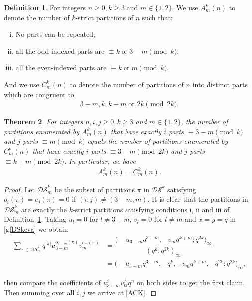 \documentclass[12pt]{amsart}
\numberwithin{equation}{section}
\theoremstyle{plain}
\newtheorem{theorem}{Theorem}[section]
\theoremstyle{definition}
\newtheorem{Def}[theorem]{Definition}
\begin{document}
\begin{Def}\label{kAC}
For integers $n\geq 0, k\geq 3$ and $m\in\{1,2\}$. We use $A^k_m(n)$ to denote the number of $k$-strict partitions of $n$ such that:
\begin{enumerate}[i.]
\item No parts can be repeated;
\item all the odd-indexed parts are $\equiv k\; \text{or}\;  3-m \pmod k$;
\item all the even-indexed parts are $\equiv k\; \text{or}\; m \pmod k$.
\end{enumerate}
And we use $C^k_m(n)$ to denote the number of partitions of $n$ into distinct parts which are
congruent  to
\begin{align}\label{Ckmn}
 3-m, k, k+m \text{ or } 2k\pmod {2k}.
\end{align}
\end{Def}
\begin{theorem}\label{bu-k}
For integers $n,i,j\geq 0, k\geq 3$ and $m\in\{1,2\}$, the number of partitions enumerated by $A^k_m(n)$ that have exactly $i$ parts $\equiv 3-m \pmod k$ and $j$ parts $\equiv m \pmod k$ 
equals the number of partitions enumerated by $C^k_m(n)$ that have exactly $i$ parts $\equiv 3-m \pmod {2k}$ and $j$ parts $\equiv k+m \pmod {2k}$. In particular, we have
\begin{align}\label{ACK}
A^k_m(n)=C^k_m(n). 
\end{align}


\end{theorem}
\begin{proof}
Let $\mathcal{DS}_m^k$ be the subset of partitions $\pi$ in $\mathcal{DS}^k$ satisfying 
 $o_i(\pi)=e_j(\pi)=0$ if $(i,j)\neq (3-m, m)$. 
 It is clear that the partitions in  $\mathcal{DS}_m^k$ are exactly the $k$-strict partitions 
 satisfying conditions i, ii and iii of Definition~\ref{kAC}.
Taking  $u_l=0$ for $l\neq 3-m$, $v_l=0$ for $l\neq m$ and $x=y=q$ in \eqref{gfDSkeva}  we obtain
\begin{align*}
\sum\limits_{\pi\in \mathcal{DS}_m^k}q^{|\pi|}u_{3-m}^{\textrm{o}_{3-m}(\pi)}v_m^{\textrm{e}_m(\pi)}
&=\dfrac{\bigl(-u_{3-m}q^{3-m},-v_mq^{k+m};q^{2k}\bigr)_{\infty}}{(q^k;q^{2k})_{\infty}}\\
&=
\bigl(-u_{3-m}q^{3-m},-q^k, -v_mq^{k+m}, -q^{2k};q^{2k}\bigr)_{\infty},
\end{align*}






then compare the coefficients of $u_{3-m}^iv_m^jq^n$ on both sides to get the first claim. Then summing over all $i,j$ we arrive at \eqref{ACK}.

\end{proof}
\end{document}
